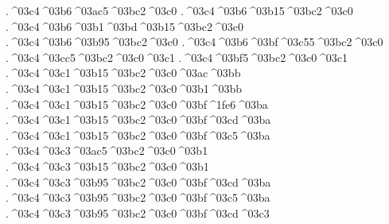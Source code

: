 {.^^^^03c4^^^^03b6^^^^03ac5^^^^03bc2^^^^03c0    %
.^^^^03c4^^^^03b6^^^^03b15^^^^03bc2^^^^03c0
.^^^^03c4^^^^03b6^^^^03b1^^^^03bd^^^^03b15^^^^03bc2^^^^03c0   %
.^^^^03c4^^^^03b6^^^^03b95^^^^03bc2^^^^03c0     %
.^^^^03c4^^^^03b6^^^^03bf^^^^03c55^^^^03bc2^^^^03c0    %
.^^^^03c4^^^^03cc5^^^^03bc2^^^^03c0^^^^03c1    %
.^^^^03c4^^^^03bf5^^^^03bc2^^^^03c0^^^^03c1
.^^^^03c4^^^^03c1^^^^03b15^^^^03bc2^^^^03c0^^^^03ac^^^^03bb  %
.^^^^03c4^^^^03c1^^^^03b15^^^^03bc2^^^^03c0^^^^03b1^^^^03bb
.^^^^03c4^^^^03c1^^^^03b15^^^^03bc2^^^^03c0^^^^03bf^^^^1fe6^^^^03ba %
.^^^^03c4^^^^03c1^^^^03b15^^^^03bc2^^^^03c0^^^^03bf^^^^03cd^^^^03ba
.^^^^03c4^^^^03c1^^^^03b15^^^^03bc2^^^^03c0^^^^03bf^^^^03c5^^^^03ba
.^^^^03c4^^^^03c3^^^^03ac5^^^^03bc2^^^^03c0^^^^03b1   %
.^^^^03c4^^^^03c3^^^^03b15^^^^03bc2^^^^03c0^^^^03b1
.^^^^03c4^^^^03c3^^^^03b95^^^^03bc2^^^^03c0^^^^03bf^^^^03cd^^^^03ba %
.^^^^03c4^^^^03c3^^^^03b95^^^^03bc2^^^^03c0^^^^03bf^^^^03c5^^^^03ba
.^^^^03c4^^^^03c3^^^^03b95^^^^03bc2^^^^03c0^^^^03bf^^^^03cd^^^^03c3 %
}
